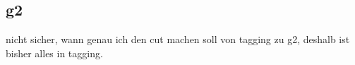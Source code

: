 
\FloatBarrier
\subsection{g2}
\label{ssec:g2}
\FloatBarrier

nicht sicher, wann genau ich den cut machen soll von tagging zu g2, deshalb ist bisher alles in tagging.
